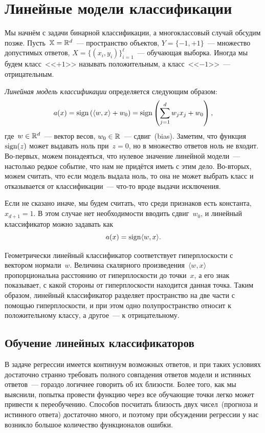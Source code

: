 \documentclass[12pt,fleqn]{article}
\begin{document}
\section{Линейные модели классификации}

Мы начнём с задачи бинарной классификации, а многоклассовый случай обсудим позже.
Пусть~$\mathbb{X} = \mathbb{R}^d$~--- пространство объектов,
$Y = \{-1, +1\}$~--- множество допустимых ответов,
$X = \{(x_i, y_i)\}_{i = 1}^\ell$~--- обучающая выборка.
Иногда мы будем класс~<<$+1$>> называть положительным, а класс~<<$-1$>>~--- отрицательным.

\emph{Линейная модель классификации} определяется следующим образом:
\[
    a(x) =
    \mathop{\rm sign}\limits \left(
        \langle w, x \rangle + w_0
    \right)
    =
    \mathop{\rm sign}\limits \left(
        \sum_{j = 1}^{d} w_j x_j + w_0
    \right),
\]
где~$w \in \mathbb{R}^d$~--- вектор весов, $w_0 \in \mathbb{R}$~--- сдвиг~(bias).
Заметим, что функция~$\mathop{\rm sign}\limits(z)$ может выдавать ноль при~$z = 0$,
но в множество ответов ноль не входит.
Во-первых, можем понадеяться, что нулевое значение линейной модели~--- настолько
редкое событие, что нам не придётся иметь с этим дело.
Во-вторых, можем считать, что если модель выдала ноль, то она не может выбрать класс
и отказывается от классификации~--- что-то вроде выдачи исключения.

Если не сказано иначе, мы будем считать, что среди признаков
есть константа, $x_{d + 1} = 1$.
В этом случае нет необходимости вводить сдвиг~$w_0$,
и линейный классификатор можно задавать как
\[
    a(x) = \mathop{\rm sign}\limits \langle w, x \rangle.
\]

Геометрически линейный классификатор соответствует гиперплоскости с вектором нормали~$w$.
Величина скалярного произведения~$\langle w, x \rangle$ пропорциональна расстоянию
от гиперплоскости до точки~$x$, а его знак показывает, с какой стороны от гиперплоскости находится
данная точка.
Таким образом, линейный классификатор разделяет пространство на две части с помощью гиперплоскости,
и при этом одно полупространство относит к положительному классу, а другое~--- к отрицательному.

\subsection{Обучение линейных классификаторов}

В задаче регрессии имеется континуум возможных ответов, и при таких условиях
достаточно странно требовать полного совпадения ответов модели и истинных ответов~---
гораздо логичнее говорить об их близости.
Более того, как мы выяснили, попытка провести функцию через все обучающие точки
легко может привести к переобучению.
Способов посчитать близость двух чисел~(прогноза и истинного ответа) достаточно много,
и поэтому при обсуждении регрессии у нас возникло большое количество функционалов ошибки.
\end{document}
